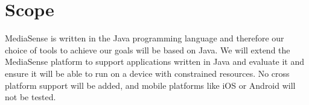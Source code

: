 \section{Scope}
MediaSense is written in the Java programming language and therefore our choice of tools to achieve our goals will be based on Java. We will extend the MediaSense platform to support applications written in Java and evaluate it and ensure it will be able to run on a device with constrained resources. No cross platform support will be added, and mobile platforms like iOS or Android will not be tested.
